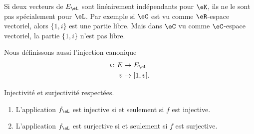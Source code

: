 \begin{remark}
    Si deux vecteurs de \( E_{\eL}\) sont linéairement indépendants pour \( \eK\), ils ne le sont pas spécialement pour \( \eL\). Par exemple si \( \eC\) est vu comme \( \eR\)-espace vectoriel, alors \( \{ 1,i \}\) est une partie libre. Mais dans \( \eC\) vu comme \( \eC\)-espace vectoriel, la partie \( \{ 1,i \}\) n'est pas libre.
\end{remark}

Nous définissons aussi l'injection canonique
\begin{equation}
    \begin{aligned}
        \iota\colon E&\to E_{\eL} \\
        v&\mapsto [1,v]. 
    \end{aligned}
\end{equation}

\begin{proposition}      \label{PropooWECLooHPzIHw}
    Injectivité et surjectivité respectées.
    \begin{enumerate}
        \item
            L'application \( f_{\eL}\) est injective si et seulement si \( f\) est injective.    
        \item
            L'application \( f_{\eL}\) est surjective si et seulement si \( f\) est surjective.    
    \end{enumerate}
\end{proposition}

